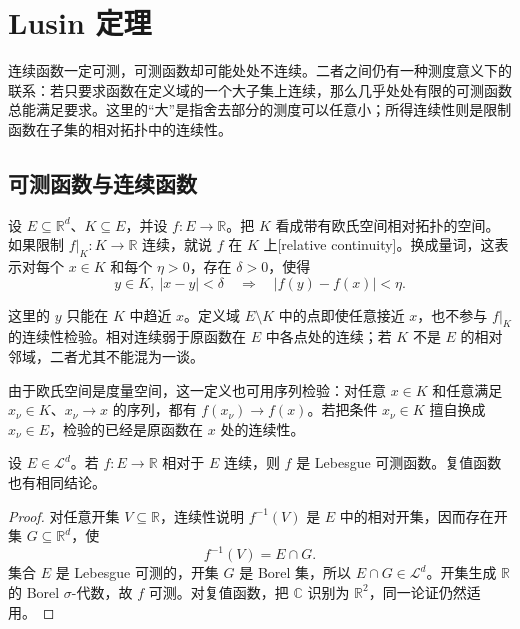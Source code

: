 \section{Lusin 定理}
\label{b1:sec:0404}

连续函数一定可测，可测函数却可能处处不连续。二者之间仍有一种测度意义下的联系：若只要求函数在定义域的一个大子集上连续，那么几乎处处有限的可测函数总能满足要求。这里的“大”是指舍去部分的测度可以任意小；所得连续性则是限制函数在子集的相对拓扑中的连续性。

\subsection{可测函数与连续函数}
\label{b1:subsec:040401}

设 \(E\subseteq\mathbb R^d\)、\(K\subseteq E\)，并设 \(f:E\rightarrow\mathbb R\)。把 \(K\) 看成带有欧氏空间相对拓扑的空间。如果限制
\(f|_K:K\rightarrow\mathbb R\) 连续，就说 \(f\) 在 \(K\) 上[relative continuity]。换成量词，这表示对每个 \(x\in K\) 和每个 \(\eta>0\)，存在 \(\delta>0\)，使得
\[
 y\in K,\ |x-y|<\delta
 \quad\Longrightarrow\quad
 |f(y)-f(x)|<\eta.
\]

这里的 \(y\) 只能在 \(K\) 中趋近 \(x\)。定义域 \(E\setminus K\) 中的点即使任意接近 \(x\)，也不参与 \(f|_K\) 的连续性检验。相对连续弱于原函数在 \(E\) 中各点处的连续；若 \(K\) 不是 \(E\) 的相对邻域，二者尤其不能混为一谈。

\ProseParagraphBreak

由于欧氏空间是度量空间，这一定义也可用序列检验：对任意
\(x\in K\) 和任意满足 \(x_\nu\in K\)、\(x_\nu\to x\) 的序列，都有
\(f(x_\nu)\to f(x)\)。若把条件 \(x_\nu\in K\) 擅自换成
\(x_\nu\in E\)，检验的已经是原函数在 \(x\) 处的连续性。

\begin{proposition}
\label{b1:prop:relative-continuity-implies-measurability}
设 \(E\in\mathcal L^d\)。若 \(f:E\rightarrow\mathbb R\) 相对于 \(E\) 连续，则 \(f\) 是 Lebesgue 可测函数。复值函数也有相同结论。
\end{proposition}
\begin{proof}
对任意开集 \(V\subseteq\mathbb R\)，连续性说明 \(f^{-1}(V)\) 是 \(E\) 中的相对开集，因而存在开集 \(G\subseteq\mathbb R^d\)，使
\[
f^{-1}(V)=E\cap G.
\]
集合 \(E\) 是 Lebesgue 可测的，开集 \(G\) 是 Borel 集，所以
\(E\cap G\in\mathcal L^d\)。开集生成 \(\mathbb R\) 的 Borel
\(\sigma\)-代数，故 \(f\) 可测。对复值函数，把 \(\mathbb C\) 识别为
\(\mathbb R^2\)，同一论证仍然适用。
\end{proof}

